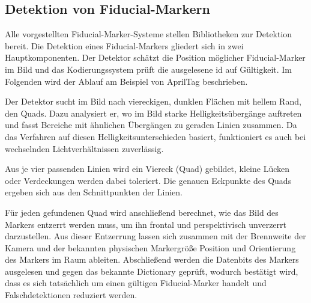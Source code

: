 \subsection*{Detektion von Fiducial-Markern}
\label{sec:marker_detektion}
Alle vorgestellten Fiducial-Marker-Systeme stellen Bibliotheken zur Detektion bereit.
Die Detektion eines Fiducial-Markers gliedert sich in zwei Hauptkomponenten.
Der Detektor schätzt die Position möglicher Fiducial-Marker im Bild und das Kodierungssystem prüft die ausgelesene \gls{id} auf Gültigkeit.
Im Folgenden wird der Ablauf am Beispiel von AprilTag beschrieben.~\cite{Olson5979561}

Der Detektor sucht im Bild nach viereckigen, dunklen Flächen mit hellem 
Rand, den Quads.
Dazu analysiert er, wo im Bild starke Helligkeitsübergänge auftreten und 
fasst Bereiche mit ähnlichen Übergängen zu geraden Linien zusammen.
Da das Verfahren auf diesen Helligkeitsunterschieden basiert, funktioniert 
es auch bei wechselnden Lichtverhältnissen zuverlässig.~\cite{Olson5979561}

Aus je vier passenden Linien wird ein Viereck (Quad) gebildet, kleine Lücken oder Verdeckungen werden dabei toleriert.
Die genauen Eckpunkte des Quads ergeben sich aus den Schnittpunkten der 
Linien.~\cite{Olson5979561}

Für jeden gefundenen Quad wird anschließend berechnet, wie das Bild des 
Markers entzerrt werden muss, um ihn frontal und perspektivisch unverzerrt 
darzustellen.
Aus dieser Entzerrung lassen sich zusammen mit der Brennweite der Kamera 
und der bekannten physischen Markergröße Position und Orientierung des 
Markers im Raum ableiten.
Abschließend werden die Datenbits des Markers ausgelesen und gegen das
bekannte Dictionary geprüft, wodurch bestätigt wird, dass es sich tatsächlich um einen
gültigen Fiducial-Marker handelt und Falschdetektionen reduziert werden.~\cite{Olson5979561}




